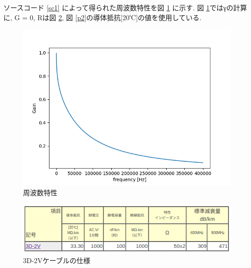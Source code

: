 \documentclass[a4j,12pt,]{jarticle}
\begin{document}
ソースコード \ref{sc1} によって得られた周波数特性を図 \ref{p4} に示す.
図 \ref{p4}ではγの計算に, G = 0, Rは図 \ref{p1}, 図 \ref{p2}の導体抵抗[20℃]の値を使用している.


\begin{figure}[H]
  \begin{center}
    \includegraphics[width=140mm]{frequency_characteristic.png}
    \caption{周波数特性}
    \label{p4}
  \end{center}
\end{figure}

\begin{figure}[H]
  \begin{center}
    \includegraphics[width=140mm]{3d2v.png}
    \caption{3D-2Vケーブルの仕様}
    \label{p1}
  \end{center}
\end{figure}
\end{document}
